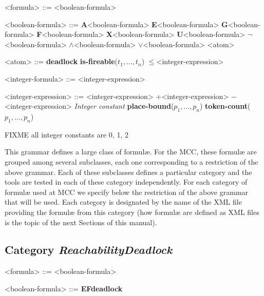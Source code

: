 \documentclass[10pt,english,a4paper]{article}
\newcommand\ctla             {\textbf{A}\xspace}
\newcommand\ctle             {\textbf{E}\xspace}
\newcommand\ltlf             {\textbf{F}\xspace}
\newcommand\ltlg             {\textbf{G}\xspace}
\newcommand\ltlx             {\textbf{X}\xspace}
\newcommand\ltlu             {\textbf{U}\xspace}
\newcommand\logicnot         {\boldmath$\lnot$\xspace}
\newcommand\logicand         {\boldmath$\land$\xspace}
\newcommand\logicor          {\boldmath$\lor$\xspace}
\newcommand\atomleq          {\boldmath$\leq$\xspace}
\newcommand\atomdead         {\textbf{deadlock}\xspace}
\newcommand\atomisfire[1]    {\textbf{is-fireable}(#1)}
\newcommand\atomplacebnd[1]  {\textbf{place-bound}(#1)}
\newcommand\atomtokenscnt[1] {\textbf{token-count}(#1)}
\newcommand\exprplus         {\boldmath$+$\xspace}
\newcommand\exprminus        {\boldmath$-$\xspace}
\begin{document}
\begin{grammar}
<formula> ::= <boolean-formula>

<boolean-formula> ::= \ctla <boolean-formula>
\alt \ctle <boolean-formula>
\alt \ltlg <boolean-formula>
\alt \ltlf <boolean-formula>
\alt \ltlx <boolean-formula>
 \ltlu <boolean-formula>
\alt \logicnot <boolean-formula>
 \logicand <boolean-formula>
 \logicor <boolean-formula>
\alt <atom>

<atom> ::= \atomdead
\alt \atomisfire{$t_1, \ldots, t_n$}
 \atomleq <integer-expression>

<integer-formula> ::= <integer-expression>

<integer-expression> ::=
     <integer-expression> \exprplus <integer-expression>
 \exprminus <integer-expression>
\alt \textit{Integer constant}
\alt \atomplacebnd{$p_1, \ldots, p_n$}
\alt \atomtokenscnt{$p_1, \ldots, p_n$}

\end{grammar}

FIXME all integer constants are 0, 1, 2

This grammar defines a large class of formulæ.
For the MCC, these formulæ are grouped among several subclasses, each one corresponding to a restriction of the above grammar.
Each of these subclasses defines a particular category and the tools are tested in each of these category independently.
For each category of formulæ used at MCC we specify below the restriction of the above grammar that will be used.
Each category is designated by the name of the XML file providing the formulæ from this category (how formulæ are defined as XML files is the topic of the next Sections of this manual).

%
%
%
%
%

\subsection{Category \textit{ReachabilityDeadlock}}

\begin{grammar}

<formula> ::= <boolean-formula>

<boolean-formula> ::= \ctle \ltlf \atomdead

\end{grammar}
\end{document}
